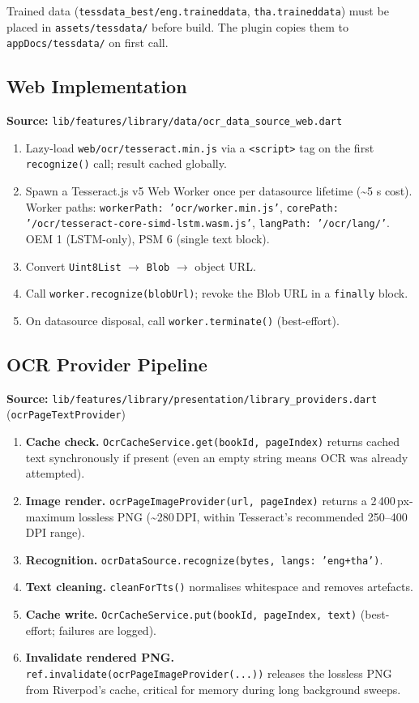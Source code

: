 \documentclass[11pt,a4paper]{article}
\begin{document}
Trained data (\texttt{tessdata\_best/eng.traineddata},
\texttt{tha.traineddata}) must be placed in \texttt{assets/tessdata/} before build.
The plugin copies them to \texttt{appDocs/tessdata/} on first call.

\subsection{Web Implementation}

\textbf{Source:} \texttt{lib/features/library/data/ocr\_data\_source\_web.dart}

\begin{enumerate}
  \item Lazy-load \texttt{web/ocr/tesseract.min.js} via a \texttt{<script>} tag on the
    first \texttt{recognize()} call; result cached globally.
  \item Spawn a Tesseract.js v5 Web Worker once per datasource lifetime
    (\textasciitilde{}5 s cost). Worker paths:
    \texttt{workerPath: 'ocr/worker.min.js'},
    \texttt{corePath: '/ocr/tesseract-core-simd-lstm.wasm.js'},
    \texttt{langPath: '/ocr/lang/'}.
    OEM 1 (LSTM-only), PSM 6 (single text block).
  \item Convert \texttt{Uint8List} $\rightarrow$ \texttt{Blob} $\rightarrow$ object URL.
  \item Call \texttt{worker.recognize(blobUrl)}; revoke the Blob URL in a
    \texttt{finally} block.
  \item On datasource disposal, call \texttt{worker.terminate()} (best-effort).
\end{enumerate}

\subsection{OCR Provider Pipeline}

\textbf{Source:} \texttt{lib/features/library/presentation/library\_providers.dart}
(\texttt{ocrPageTextProvider})

\begin{enumerate}
  \item \textbf{Cache check.} \texttt{OcrCacheService.get(bookId, pageIndex)} returns
    cached text synchronously if present (even an empty string means OCR was already
    attempted).
  \item \textbf{Image render.} \texttt{ocrPageImageProvider(url, pageIndex)} returns a
    2\,400\,px-maximum lossless PNG (\textasciitilde{}280\,DPI, within Tesseract's
    recommended 250--400\,DPI range).
  \item \textbf{Recognition.} \texttt{ocrDataSource.recognize(bytes, langs: 'eng+tha')}.
  \item \textbf{Text cleaning.} \texttt{cleanForTts()} normalises whitespace and removes
    artefacts.
  \item \textbf{Cache write.} \texttt{OcrCacheService.put(bookId, pageIndex, text)}
    (best-effort; failures are logged).
  \item \textbf{Invalidate rendered PNG.} \texttt{ref.invalidate(ocrPageImageProvider(...))}
    releases the lossless PNG from Riverpod's cache, critical for memory during long
    background sweeps.
\end{enumerate}
\end{document}
